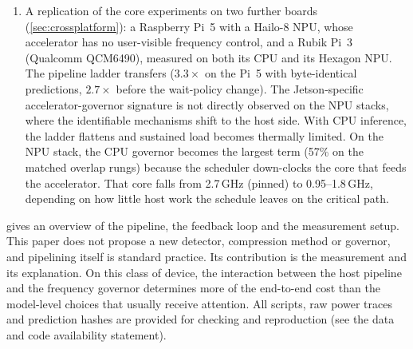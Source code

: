 \begin{enumerate}
  pipeline (\cref{sec:model}). Lower input resolution buys 27\% throughput in
  a naive pipeline but only 2--4\% in an optimized one (6--10\% with
  Python's cyclic garbage collector disabled). The compression and
  routing attempts are reported as negative results. On YOLO26s and
  YOLOv10n, the pipeline effects are comparable to YOLO26n's
  ($5.6$--$6.9\times$ over the standard predictor).
\item A replication of the core experiments on two further boards
  (\cref{sec:crossplatform}): a Raspberry Pi~5 with a Hailo-8 NPU,
  whose accelerator has no user-visible frequency control, and a Rubik
  Pi~3 (Qualcomm QCM6490), measured on both its CPU and its Hexagon
  NPU. The pipeline ladder transfers ($3.3\times$ on the Pi~5 with
  byte-identical predictions, $2.7\times$ before the wait-policy
  change). The Jetson-specific accelerator-governor signature is not
  directly observed on the NPU stacks, where the identifiable mechanisms
  shift to the host side. With CPU inference, the ladder flattens and
  sustained load becomes thermally limited. On the NPU stack, the CPU
  governor becomes the largest term (57\% on the matched overlap rungs)
  because the scheduler down-clocks the core that feeds the
  accelerator. That core falls from 2.7\,GHz (pinned) to
  0.95--1.8\,GHz, depending on how little host work the schedule leaves
  on the critical path.
\end{enumerate}

 gives an overview of the pipeline, the feedback
loop and the measurement setup. This paper does not propose a new
detector, compression method or governor, and pipelining itself is
standard practice. Its contribution
is the measurement and its explanation. On this class of device, the
interaction between the host pipeline and the frequency governor
determines more of the end-to-end cost than the model-level choices
that usually receive attention. All scripts, raw power traces and
prediction hashes are provided for checking and reproduction (see the
data and code availability statement).
